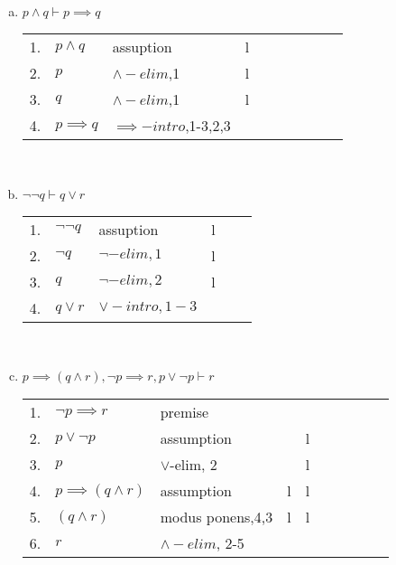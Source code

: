 \documentclass{article}
\begin{document}
\begin{enumerate}[\bf I.]
\begin{enumerate}[1.]
\begin{enumerate}[a.]
\begin{tabular}{l ll lll llll}
   \end{tabular} \\
 \item $p \land q \vdash p \implies q$ \\
   \begin{tabular}{l ll lll llll}
     1. & $p \land q$ & assuption & l\\
     2. & $p$         & $\land-elim$,1 & l\\
     3. & $q$         & $\land-elim$,1 & l\\
     4. & $p \implies q$ & $\implies-intro$,1-3,2,3 \\
   \end{tabular} \\
 \item $\neg\neg q \vdash q \lor r$ \\
   \begin{tabular}{l ll lll}
    1. & $\neg\neg q$ & assuption & l\\
    2. & $\neg q$ & $\neg-elim, 1$ & l \\
    3. & $q$ & $\neg-elim, 2$ & l\\
    4. & $q \lor r$ & $\lor-intro, 1-3$\\
   \end{tabular} \\
 \item $p \implies (q \land r), \neg p \implies r, p \lor \neg p \vdash r$ \\
   \begin{tabular}{l ll lll llll }
    1. & $\neg p \implies r$       & premise \\
    2. & $p \lor \neg p$           & assumption       &   & l  \\
    3. & $p$                       & $\lor$-elim, 2   &   & l  \\
    4. & $p \implies (q \land r) $ & assumption       & l & l  \\
    5. & $(q \land r)$             & modus ponens,4,3 & l & l  \\
    6. & $r$                       & $\land-elim$, 2-5 \\
   \end{tabular} \\
\end{enumerate}
\end{enumerate}

\vspace{12pt}


\end{enumerate}
\end{document}
